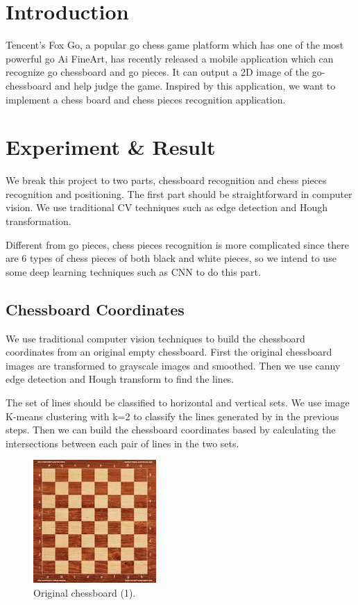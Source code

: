 \documentclass[a4paper,12pt]{article}
\begin{document}
\begin{spacing}{1.3}
\section{Introduction}

Tencent's Fox Go, a popular go chess game platform which has one of the most powerful go Ai FineArt, has recently released a mobile application which can recognize go chessboard and go pieces. It can output a 2D image of the go-chessboard and help judge the game. Inspired by this application, we want to implement a chess board and chess pieces recognition application. 


\section{Experiment \& Result}

We break this project to two parts, chessboard recognition and chess pieces recognition and positioning. The first part should be straightforward in computer vision. We use traditional CV techniques such as edge detection and Hough transformation.

Different from go pieces, chess pieces recognition is more complicated since there are 6 types of chess pieces of both black and white pieces, so we intend to use some deep learning techniques such as CNN to do this part.


\subsection{Chessboard Coordinates}
We use traditional computer vision techniques to build the chessboard coordinates from an original empty chessboard. First the original chessboard images are transformed to grayscale images and smoothed. Then we use canny edge detection and Hough transform to find the lines. 

The set of lines should be classified to horizontal and vertical sets. We use image K-means clustering with k=2 to classify the lines generated by in the previous steps. Then we can build the chessboard coordinates based by calculating the intersections between each pair of lines in the two sets.

\begin{figure}[H]
	\centering
	\includegraphics[scale=0.8]{1.jpeg}
	\caption{Original chessboard (1).}
\end{figure}


\end{spacing}
\end{document}
